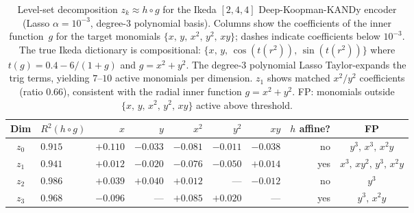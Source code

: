 \documentclass{article}
\begin{document}
\begin{table}[ht]
      \centering
      \begin{tabular}{@{}clrrrrrrc@{}}
      \toprule
      Dim & $R^2(h \circ g)$ & $x$ & $y$ & $x^2$ & $y^2$ & $xy$ & $h$ affine? & FP \\
      \midrule
      $z_0$ & $0.915$ & $+0.110$ & $-0.033$ & $-0.081$ & $-0.011$ & $-0.038$ & no & $y^3,\, x^3,\, x^2y$ \\
      $z_1$ & $0.941$ & $+0.012$ & $-0.020$ & $-0.076$ & $-0.050$ & $+0.014$ & yes & $x^3,\, xy^2,\, y^3,\, x^2y$ \\
      $z_2$ & $0.986$ & $+0.039$ & $+0.040$ & $+0.012$ & --- & $-0.012$ & no & $y^3$ \\
      $z_3$ & $0.968$ & $-0.096$ & --- & $+0.085$ & $+0.020$ & --- & yes & $y^3,\, x^2y$ \\
      \bottomrule
      \end{tabular}
      \caption{Level-set decomposition $z_k \approx h \circ g$ for the Ikeda $[2,4,4]$ Deep-Koopman-KANDy encoder (Lasso $\alpha = 10^{-3}$, degree-3 polynomial basis). Columns show the coefficients of the inner function~$g$ for the target monomials $\{x,\,y,\,x^2,\,y^2,\,xy\}$; dashes indicate coefficients below $10^{-3}$. The true Ikeda dictionary is compositional: $\{x,\,y,\,\cos(t(r^2)),\,\sin(t(r^2))\}$ where $t(g) = 0.4 - 6/(1+g)$ and $g = x^2 + y^2$. The degree-3 polynomial Lasso Taylor-expands the trig terms, yielding $7$--$10$ active monomials per dimension. $z_1$ shows matched $x^2/y^2$ coefficients (ratio $0.66$), consistent with the radial inner function $g = x^2 + y^2$. FP: monomials outside $\{x,\,y,\,x^2,\,y^2,\,xy\}$ active above threshold.}
      \label{tab:ikeda-levelset-decomposition}
  \end{table}
\end{document}
